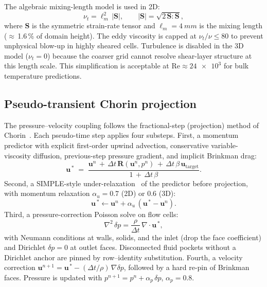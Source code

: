 \documentclass[10pt,twocolumn,letterpaper]{article}
\newcommand{\ubf}{\mathbf{u}}
\newcommand{\uT}{\mathbf{u}_{\mathrm{target}}}
\newcommand{\Sbm}{\mathbf{S}}
\newcommand{\nut}{\nu_{t}}
\newcommand{\Reyn}{\mathrm{Re}}
\begin{document}
The algebraic mixing-length model is used in 2D:
%
\begin{equation}
  \nut = \ell_{m}^{2}\,|\Sbm|,
  \qquad
  |\Sbm| = \sqrt{2\,\Sbm\!:\!\Sbm},
  \label{eq:mixing}
\end{equation}
%
where $\Sbm$ is the symmetric strain-rate tensor and
$\ell_{m} = \SI{4}{mm}$ is the mixing length
($\approx$\,1.6\,\si{\percent} of domain height). The eddy viscosity
is capped at $\nut/\nu \le 80$ to prevent unphysical blow-up in
highly sheared cells. Turbulence is disabled in the 3D model
($\nut = 0$) because the coarser grid cannot resolve shear-layer
structure at this length scale. This simplification is acceptable
at $\Reyn \approx \num{24e3}$ for bulk temperature predictions.

\subsection{Pseudo-transient Chorin projection}
\label{sec:chorin}

The pressure--velocity coupling follows the fractional-step
(projection) method of Chorin~\cite{chorin1968}. Each pseudo-time
step applies four substeps. First, a momentum predictor with
explicit first-order upwind advection, conservative
variable-viscosity diffusion, previous-step pressure gradient, and
implicit Brinkman drag:
%
\begin{equation}
  \ubf^{\,*} \;=\; \dfrac{\ubf^{n}
                   \,+\, \Delta t\,\mathbf{R}(\ubf^{n},p^{n})
                   \,+\, \Delta t\,\beta\,\uT}
                  {1 \,+\, \Delta t\,\beta}.
  \label{eq:predictor}
\end{equation}
%
Second, a SIMPLE-style under-relaxation~\cite{patankar1980} of the
predictor before projection, with momentum relaxation
$\alpha_{u}=0.7$ (2D) or $0.6$ (3D):
%
\begin{equation}
  \ubf^{\,*} \leftarrow \ubf^{n} + \alpha_{u}\,(\ubf^{\,*}-\ubf^{n}).
  \label{eq:urelax}
\end{equation}
%
Third, a pressure-correction Poisson solve on flow cells:
%
\begin{equation}
  \nabla^{2}\,\delta p
  = \frac{\rho}{\Delta t}\,\nabla\!\cdot\!\ubf^{\,*},
  \label{eq:poisson}
\end{equation}
%
with Neumann conditions at walls, solids, and the inlet (drop the
face coefficient) and Dirichlet $\delta p = 0$ at outlet faces.
Disconnected fluid pockets without a Dirichlet anchor are pinned
by row--identity substitution. Fourth, a velocity correction
$\ubf^{n+1} = \ubf^{\,*} - (\Delta t/\rho)\,\nabla\delta p$,
followed by a hard re-pin of Brinkman faces. Pressure is updated
with $p^{n+1} = p^{n} + \alpha_{p}\,\delta p$, $\alpha_{p} = 0.8$.
\end{document}
